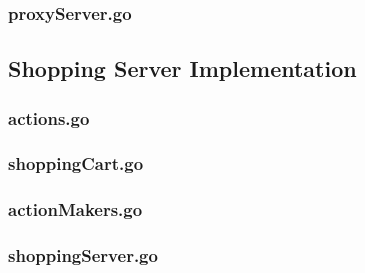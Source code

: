 \documentclass[12pt,a4paper]{article}
\begin{document}
\subsubsection*{proxyServer.go}


\newpage
\subsection*{Shopping Server Implementation}
\subsubsection*{actions.go}

\subsubsection*{shoppingCart.go}

\subsubsection*{actionMakers.go}

\newpage
\subsubsection*{shoppingServer.go}

\end{document}
